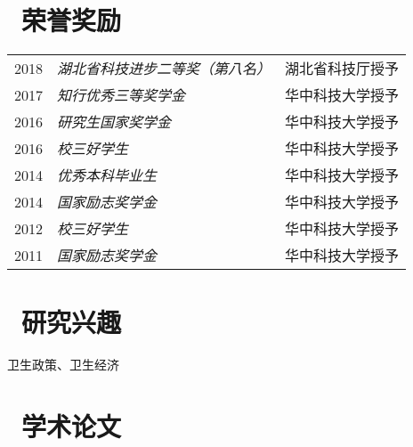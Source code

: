 \documentclass{resume}
\begin{document}
\section{\faSigning\ 荣誉奖励}
\begin{tabular}{rll}
2018 & \textit{湖北省科技进步二等奖（第八名）} & 湖北省科技厅授予 \\
2017 & \textit{知行优秀三等奖学金}           & 华中科技大学授予\\
2016 & \textit{研究生国家奖学金}             & 华中科技大学授予\\
2016 & \textit{校三好学生}                  & 华中科技大学授予\\
2014 & \textit{优秀本科毕业生}              & 华中科技大学授予\\
2014 & \textit{国家励志奖学金}              & 华中科技大学授予\\
2012 & \textit{校三好学生}                 & 华中科技大学授予\\
2011 & \textit{国家励志奖学金}              & 华中科技大学授予\\
\end{tabular}

\section{\faLeanpub\ 研究兴趣}
卫生政策、卫生经济

\section{\faFileTextO\ 学术论文}
\end{document}
